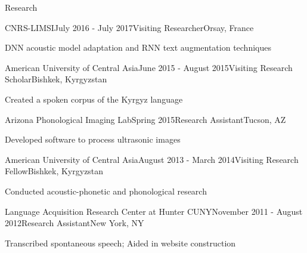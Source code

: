 \documentclass{resume} %
\begin{document}
\begin{rSection}{Research}

\begin{rSubsection}{CNRS-LIMSI}{July 2016 - July 2017}{Visiting Researcher}{Orsay, France}
\item DNN acoustic model adaptation and RNN text augmentation techniques
\end{rSubsection}

\begin{rSubsection}{American University of Central Asia}{June 2015 - August 2015}{Visiting Research Scholar}{Bishkek, Kyrgyzstan}
\item Created a spoken corpus of the Kyrgyz language
\end{rSubsection}

\begin{rSubsection}{Arizona Phonological Imaging Lab}{Spring 2015}{Research Assistant}{Tucson, AZ}
\item Developed software to process ultrasonic images
\end{rSubsection}

\begin{rSubsection}{American University of Central Asia}{August 2013 - March 2014}{Visiting Research Fellow}{Bishkek, Kyrgyzstan}
\item Conducted acoustic-phonetic and phonological research
\end{rSubsection}


\begin{rSubsection}{Language Acquisition Research Center at Hunter CUNY}{November 2011 - August 2012}{Research Assistant}{New York, NY}
\item Transcribed spontaneous speech; Aided in website construction
\end{rSubsection}


\end{rSection}
\end{document}
